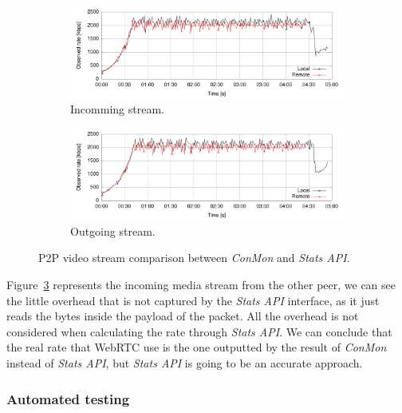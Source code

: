 \begin{figure}[h]
        \centering
        \begin{subfigure}[b]{1\textwidth}
                \centering
                \includegraphics[width=\textwidth]{./figures/p2p_incomming_cable_sample.pdf}
               \caption[Incomming stream]{Incomming stream.}
			\label{fig:p2pincommingStatsConmonWifi}
        \end{subfigure}
        \begin{subfigure}[b]{1\textwidth}
                \centering
                \includegraphics[width=\textwidth]{./figures/p2p_outgoing_cable_sample.pdf}
               \caption[Outgoing stream]{Outgoing stream.}
			\label{fig:p2poutgoingStatsConmonWifi}
	        \end{subfigure}
        \caption[P2P video stream comparison between {\it ConMon} and {\it Stats API}]{P2P video stream comparison between {\it ConMon} and {\it Stats API}.}
        \label{fig:p2pStatsConmon}
\end{figure}

Figure~\ref{fig:p2pStatsConmon} represents the incoming media stream from the other peer, we can see the little overhead that is not captured by the {\it Stats API} interface, as it just reads the bytes inside the payload of the packet. All the overhead is not considered when calculating the rate through {\it Stats API}. We can conclude that the real rate that WebRTC use is the one outputted by the result of {\it ConMon} instead of {\it Stats API}, but {\it Stats API} is going to be an accurate approach.

\subsubsection{Automated testing}

